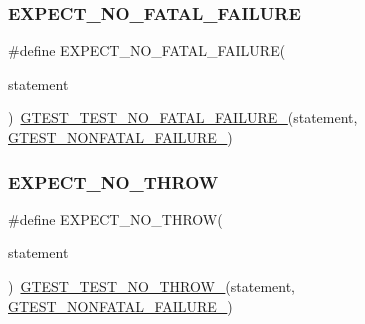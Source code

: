 \subsubsection{\texorpdfstring{EXPECT\_NO\_FATAL\_FAILURE}{EXPECT\_NO\_FATAL\_FAILURE}}
{\footnotesize\ttfamily \#define E\+X\+P\+E\+C\+T\+\_\+\+N\+O\+\_\+\+F\+A\+T\+A\+L\+\_\+\+F\+A\+I\+L\+U\+RE(\begin{DoxyParamCaption}\item[{}]{statement }\end{DoxyParamCaption})~\mbox{\hyperlink{_obj__test_2lib_2googletest-release-1_88_81_2googletest_2include_2gtest_2internal_2gtest-internal_8h_a1b37a3c446836d33040f3266a6236081}{G\+T\+E\+S\+T\+\_\+\+T\+E\+S\+T\+\_\+\+N\+O\+\_\+\+F\+A\+T\+A\+L\+\_\+\+F\+A\+I\+L\+U\+R\+E\+\_\+}}(statement, \mbox{\hyperlink{_obj__test_2lib_2googletest-release-1_88_81_2googletest_2include_2gtest_2internal_2gtest-internal_8h_a6cb7482cfa03661a91c698eb5895f642}{G\+T\+E\+S\+T\+\_\+\+N\+O\+N\+F\+A\+T\+A\+L\+\_\+\+F\+A\+I\+L\+U\+R\+E\+\_\+}})}

\mbox{\label{_obj__test_2lib_2googletest-release-1_88_81_2googletest_2include_2gtest_2gtest_8h_a2743a1438137ad857aa3f9fec3ff67ec}} 
\subsubsection{\texorpdfstring{EXPECT\_NO\_THROW}{EXPECT\_NO\_THROW}}
{\footnotesize\ttfamily \#define E\+X\+P\+E\+C\+T\+\_\+\+N\+O\+\_\+\+T\+H\+R\+OW(\begin{DoxyParamCaption}\item[{}]{statement }\end{DoxyParamCaption})~\mbox{\hyperlink{_obj__test_2lib_2googletest-release-1_88_81_2googletest_2include_2gtest_2internal_2gtest-internal_8h_a9a109d026b5a904646437d7570e13581}{G\+T\+E\+S\+T\+\_\+\+T\+E\+S\+T\+\_\+\+N\+O\+\_\+\+T\+H\+R\+O\+W\+\_\+}}(statement, \mbox{\hyperlink{_obj__test_2lib_2googletest-release-1_88_81_2googletest_2include_2gtest_2internal_2gtest-internal_8h_a6cb7482cfa03661a91c698eb5895f642}{G\+T\+E\+S\+T\+\_\+\+N\+O\+N\+F\+A\+T\+A\+L\+\_\+\+F\+A\+I\+L\+U\+R\+E\+\_\+}})}

\mbox{\label{_obj__test_2lib_2googletest-release-1_88_81_2googletest_2include_2gtest_2gtest_8h_a740cab7e3eec5c178a64b4f558bde66e}} 

